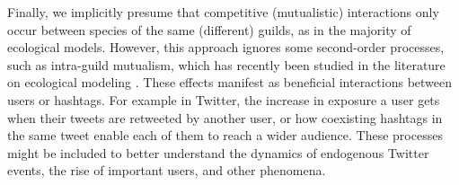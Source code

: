 Finally, we implicitly presume that competitive (mutualistic) interactions only occur between species of the same (different) guilds, as in the majority of ecological models. However, this approach ignores some second-order processes, such as intra-guild mutualism, which has recently been studied in the literature on ecological modeling \cite{crowley2007,stanton2003}. These effects manifest as beneficial interactions between users or hashtags. For example in Twitter, the increase in exposure a user gets when their tweets are retweeted by another user, or how coexisting  hashtags in the same tweet enable each of them to reach a wider audience. These processes might be included to better understand the dynamics of endogenous Twitter events, the rise of important users, and other phenomena.\\




